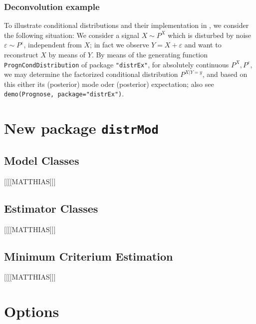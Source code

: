 \documentclass[11pt]{article}
\newcommand{\code}[1]{{\tt #1}}
\newcommand{\pkg}[1]{{\tt "#1"}}
\begin{document}
\subsubsection{Deconvolution example}

To illustrate conditional distributions and their implementation in 
\linebreak[4]\pkg{distrEx}, we consider the following situation:
We consider a signal $X\sim P^X$ which is disturbed by noise 
$\varepsilon\sim P^\varepsilon$, independent from $X$; in fact we observe
$Y=X+\varepsilon$ and want to reconstruct $X$ by means of $Y$. By means of the 
generating function \code{PrognCondDistribution}
of package \pkg{distrEx}, for absolutely continuous $P^X, P^\varepsilon$, we may 
determine the factorized conditional distribution $P^{X|Y=y}$, and based on this 
either its (posterior) mode oder (posterior) expectation; also see
\code{demo(Prognose, package="distrEx")}.

%
\section[New package distrMod]{New package {\tt distrMod}}\label{distrMod}
%
\subsection{Model Classes}
%
[[[[MATTHIAS]]]
\subsection{Estimator Classes}
%
[[[[MATTHIAS]]]
%
\subsection{Minimum Criterium Estimation}
%
[[[[MATTHIAS]]]
%
%
\section{Options}\label{options}
%
%
\end{document}
